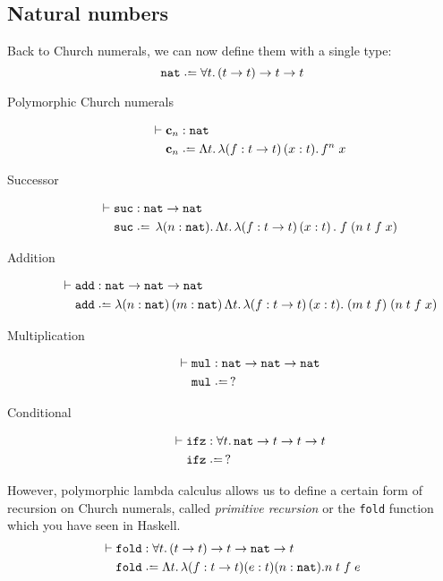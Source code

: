 \subsection{Natural numbers}
Back to Church numerals, we can now define them with a single type:
\[
  \nat \defeq \forall t.\, (t\to t)\to t\to t
\]
  \begin{description}
    \item[Polymorphic Church numerals]
      \begin{align*}
        \vdash{} & \bc_n : \nat \\
        & \bc_n \defeq \Lambda t.\,\lambda (f:t \to t)\,(x:t).\,
        f^n\;x
      \end{align*}
    \item[Successor]
      \begin{align*}
        \vdash{} & \suc : \nat \to \nat \\
        & \suc \defeq \,\lambda (n : \nat).\,\Lambda t.\,\lambda
        (f : t \to t)\,(x:t)\,.\;f\;(n\;t\;f\;x) 
      \end{align*}
    \item[Addition]
      \begin{align*}
        \vdash{} & \add : \nat \to \nat \to \nat \\
        & \add \defeq \lambda (n : \nat)\,(m:\nat)\,\Lambda t.\,
        \lambda (f:t\to t)\,(x: t).\; (m\;t\;f)\;(n\;t\;f\;x) 
      \end{align*}
    \item[Multiplication] 
      \begin{align*}
      \vdash{} & \mul : \nat\to \nat \to\nat\\
        & \mul \defeq\,?
      \end{align*}
    \item[Conditional]
      \begin{align*}
        \vdash {} & \ifz : \forall t.\,\nat \to t \to t \to t \\
        & \ifz \defeq\,?
      \end{align*}
  \end{description}
However, polymorphic lambda calculus allows us to define a certain form of
recursion on Church numerals, called \emph{primitive recursion} or the
\texttt{fold} function which you have seen in Haskell.
\begin{align*}
  \vdash{} & \mathtt{fold} : \forall t.\, (t \to t) \to t \to \nat \to t  \\
  & \mathtt{fold} \defeq \Lambda t.\, \lambda (f : t \to t)(e : t)(n : \nat). 
  n\;t\;f\;e
\end{align*}
